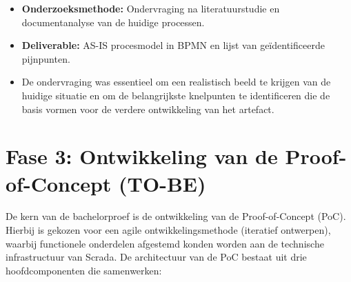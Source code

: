 \begin{itemize}
    \item \textbf{Onderzoeksmethode:} Ondervraging na literatuurstudie en documentanalyse van de huidige processen.
    \item \textbf{Deliverable:} AS-IS procesmodel in BPMN en lijst van geïdentificeerde pijnpunten.
    \item De ondervraging was essentieel om een realistisch beeld te krijgen van de huidige situatie en om de belangrijkste knelpunten te identificeren die de basis vormen voor de verdere ontwikkeling van het artefact.
\end{itemize}


\section{Fase 3: Ontwikkeling van de Proof-of-Concept (TO-BE)}
De kern van de bachelorproef is de ontwikkeling van de Proof-of-Concept (PoC). Hierbij is gekozen voor een agile ontwikkelingsmethode (iteratief ontwerpen), 
waarbij functionele onderdelen afgestemd konden worden aan de technische infrastructuur van Scrada. De architectuur van de PoC bestaat uit drie hoofdcomponenten die samenwerken:

